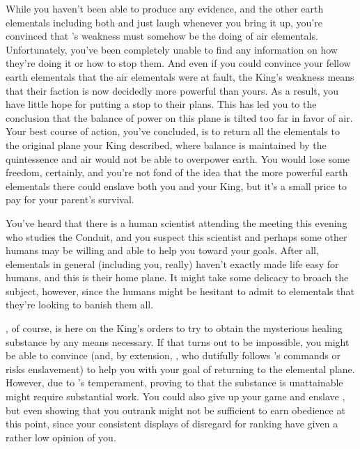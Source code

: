 \documentclass[char]{elementals}
\begin{document}
While you haven't been able to produce any evidence, and the other earth elementals including both \cEarthKing{} and \cLoyal{} just laugh whenever you bring it up, you're convinced that \cEarthKing{}'s weakness must somehow be the doing of air elementals.  Unfortunately, you've been completely unable to find any information on how they're doing it or how to stop them.  And even if you could convince your fellow earth elementals that the air elementals were at fault, the King's weakness means that their faction is now decidedly more powerful than yours.  As a result, you have little hope for putting a stop to their plans.  This has led you to the conclusion that the balance of power on this plane is tilted too far in favor of air.  Your best course of action, you've concluded, is to return all the elementals to the original plane your King described, where balance is maintained by the quintessence and air would not be able to overpower earth.  You would lose some freedom, certainly, and you're not fond of the idea that the more powerful earth elementals there could enslave both you and your King, but it's a small price to pay for your parent's survival.

You've heard that there is a human scientist attending the meeting this evening who studies the Conduit, and you suspect this scientist and perhaps some other humans may be willing and able to help you toward your goals.  After all, elementals in general (including you, really) haven't exactly made life easy for humans, and this is their home plane.  It might take some delicacy to broach the subject, however, since  the humans might be hesitant to admit to elementals that they're looking to banish them all.

\cLoyal{}, of course, is here on the King's orders to try to obtain the mysterious healing substance by any means necessary.  If that turns out to be impossible, you might be able to convince \cLoyal{\them} (and, by extension, \cMinion{}, who  dutifully follows \cLoyal{}'s commands or risks enslavement) to help you with your goal of returning to the elemental plane.  However, due to \cLoyal{}'s temperament, proving to \cLoyal{\them} that the substance is unattainable might require substantial work.  You could also give up your game and enslave \cLoyal{\them}, but even showing that you outrank \cLoyal{} might not be sufficient to earn \cLoyal{\their} obedience at this point, since your consistent displays of disregard for ranking have given \cLoyal{} a rather low opinion of you.
\end{document}
